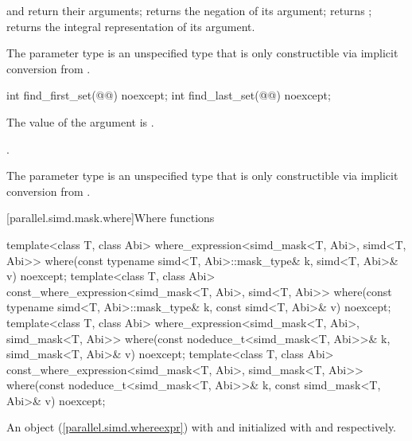\begin{itemdescr}
  \pnum\returns
   and  return their arguments;  returns the negation of its argument;  returns ;  returns the integral representation of its argument.

  \pnum\remarks
  The parameter type  is an unspecified type that is only constructible via implicit conversion from .
\end{itemdescr}

\begin{itemdecl}
int find_first_set(@@) noexcept;
int find_last_set(@@) noexcept;
\end{itemdecl}

\begin{itemdescr}
  \pnum\requires
  The value of the argument is .

  \pnum\returns
  .

  \pnum\remarks
  The parameter type  is an unspecified type that is only constructible via implicit conversion from .
\end{itemdescr}

[parallel.simd.mask.where]{Where functions}

\begin{itemdecl}
template<class T, class Abi>
  where_expression<simd_mask<T, Abi>, simd<T, Abi>> where(const typename simd<T, Abi>::mask_type& k,
                                                          simd<T, Abi>& v) noexcept;
template<class T, class Abi>
  const_where_expression<simd_mask<T, Abi>, simd<T, Abi>> where(const typename simd<T, Abi>::mask_type& k,
                                                                const simd<T, Abi>& v) noexcept;
template<class T, class Abi>
  where_expression<simd_mask<T, Abi>, simd_mask<T, Abi>> where(const nodeduce_t<simd_mask<T, Abi>>& k,
                                                               simd_mask<T, Abi>& v) noexcept;
template<class T, class Abi>
  const_where_expression<simd_mask<T, Abi>, simd_mask<T, Abi>> where(const nodeduce_t<simd_mask<T, Abi>>& k,
                                                                     const simd_mask<T, Abi>& v) noexcept;
\end{itemdecl}

\begin{itemdescr}
  \pnum\returns
  An object (\ref{parallel.simd.whereexpr}) with  and  initialized with  and  respectively.
\end{itemdescr}

